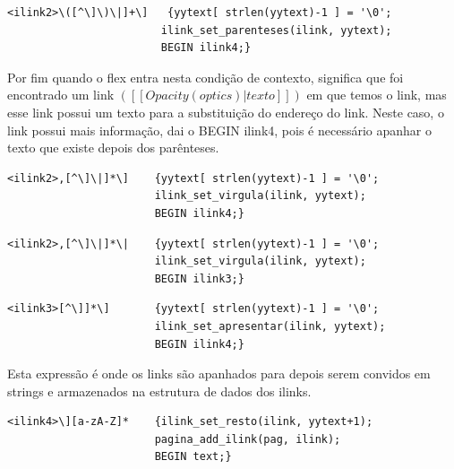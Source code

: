 \documentclass[11pt, a4paper, oneside]{article}
\begin{document}
\begin{verbatim}
<ilink2>\([^\]\)\|]+\]   {yytext[ strlen(yytext)-1 ] = '\0';
                        ilink_set_parenteses(ilink, yytext);
                        BEGIN ilink4;}
\end{verbatim}
Por fim quando o flex entra nesta condição de contexto, significa que foi encontrado um link \begin{math}([[Opacity (optics)|texto]])\end{math} em que temos o link, mas esse link possui um texto para a substituição do endereço do link.
Neste caso, o link possui mais informação, dai o BEGIN ilink4, pois é necessário apanhar o texto que existe depois dos parênteses.

\begin{verbatim}
<ilink2>,[^\]\|]*\]    {yytext[ strlen(yytext)-1 ] = '\0';
                       ilink_set_virgula(ilink, yytext);
                       BEGIN ilink4;}
\end{verbatim}

\begin{verbatim}
<ilink2>,[^\]\|]*\|    {yytext[ strlen(yytext)-1 ] = '\0';
                       ilink_set_virgula(ilink, yytext);
                       BEGIN ilink3;}
\end{verbatim}

\begin{verbatim}
<ilink3>[^\]]*\]       {yytext[ strlen(yytext)-1 ] = '\0';
                       ilink_set_apresentar(ilink, yytext);
                       BEGIN ilink4;}
\end{verbatim}
Esta expressão é onde os links são apanhados para depois serem convidos em strings e armazenados na estrutura de dados dos ilinks.

\begin{verbatim}
<ilink4>\][a-zA-Z]*    {ilink_set_resto(ilink, yytext+1);
                       pagina_add_ilink(pag, ilink);
                       BEGIN text;}
\end{verbatim}
\end{document}
